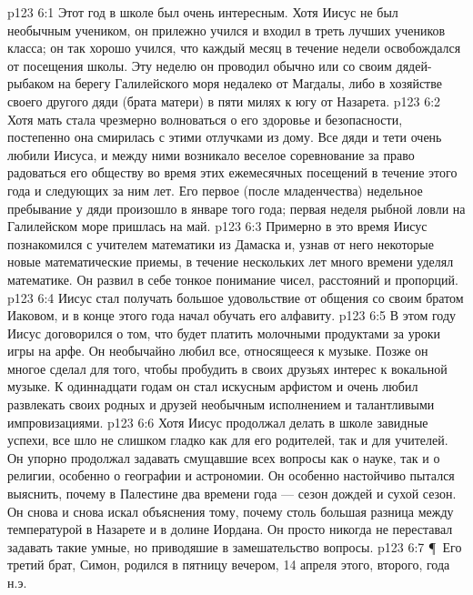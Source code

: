 \vs p123 6:1 Этот год в школе был очень интересным. Хотя Иисус не был необычным учеником, он прилежно учился и входил в треть лучших учеников класса; он так хорошо учился, что каждый месяц в течение недели освобождался от посещения школы. Эту неделю он проводил обычно или со своим дядей\hyp{}рыбаком на берегу Галилейского моря недалеко от Магдалы, либо в хозяйстве своего другого дяди (брата матери) в пяти милях к югу от Назарета.
\vs p123 6:2 Хотя мать стала чрезмерно волноваться о его здоровье и безопасности, постепенно она смирилась с этими отлучками из дому. Все дяди и тети очень любили Иисуса, и между ними возникало веселое соревнование за право радоваться его обществу во время этих ежемесячных посещений в течение этого года и следующих за ним лет. Его первое (после младенчества) недельное пребывание у дяди произошло в январе того года; первая неделя рыбной ловли на Галилейском море пришлась на май.
\vs p123 6:3 Примерно в это время Иисус познакомился с учителем математики из Дамаска и, узнав от него некоторые новые математические приемы, в течение нескольких лет много времени уделял математике. Он развил в себе тонкое понимание чисел, расстояний и пропорций.
\vs p123 6:4 Иисус стал получать большое удовольствие от общения со своим братом Иаковом, и в конце этого года начал обучать его алфавиту.
\vs p123 6:5 В этом году Иисус договорился о том, что будет платить молочными продуктами за уроки игры на арфе. Он необычайно любил все, относящееся к музыке. Позже он многое сделал для того, чтобы пробудить в своих друзьях интерес к вокальной музыке. К одиннадцати годам он стал искусным арфистом и очень любил развлекать своих родных и друзей необычным исполнением и талантливыми импровизациями.
\vs p123 6:6 Хотя Иисус продолжал делать в школе завидные успехи, все шло не слишком гладко как для его родителей, так и для учителей. Он упорно продолжал задавать смущавшие всех вопросы как о науке, так и о религии, особенно о географии и астрономии. Он особенно настойчиво пытался выяснить, почему в Палестине два времени года --- сезон дождей и сухой сезон. Он снова и снова искал объяснения тому, почему столь большая разница между температурой в Назарете и в долине Иордана. Он просто никогда не переставал задавать такие умные, но приводяшие в замешательство вопросы.
\vs p123 6:7 \P\ Его третий брат, Симон, родился в пятницу вечером, 14 апреля этого, второго, года н.э.
